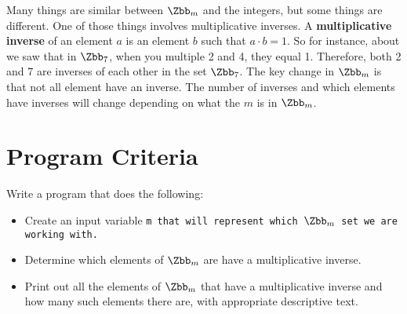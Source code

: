 \documentclass{article}
\def\prog#1{
\vspace{.1in}\begin{mdframed} \begin{center} \textbf{Programming Reminders} \end{center}#1 \end{mdframed} }
\begin{document}
	Many things are similar between $\Zbb_m$ and the integers, but some things are different.  One of those things involves multiplicative inverses.  A \textbf{multiplicative  inverse} of an element $a$ is an element $b$ such that $a \cdot b = 1$.  So for instance, about we saw that in $\Zbb_7$, when you multiple 2 and 4, they equal 1.  Therefore, both 2 and 7 are inverses of each other in the set $\Zbb_7$.  The key change in $\Zbb_m$ is that not all element have an inverse.  The number of inverses and which elements have inverses will change depending on what the $m$ is in $\Zbb_m$.    

 
 	
 	
 	
 	
 	
 	
 	

	
	
	
	
	
	
	
	




\section*{Program Criteria}
	Write a program that does the following:
	\begin{itemize}
		\item Create an input variable \tt{m} that will represent which $\Zbb_m$ set we are working with.
		\item Determine which elements of $\Zbb_m$ are have a multiplicative inverse.
		\item Print out all the elements of $\Zbb_m$ that have a multiplicative inverse and how many such elements there are, with appropriate descriptive text.	
	\end{itemize}







\end{document}
